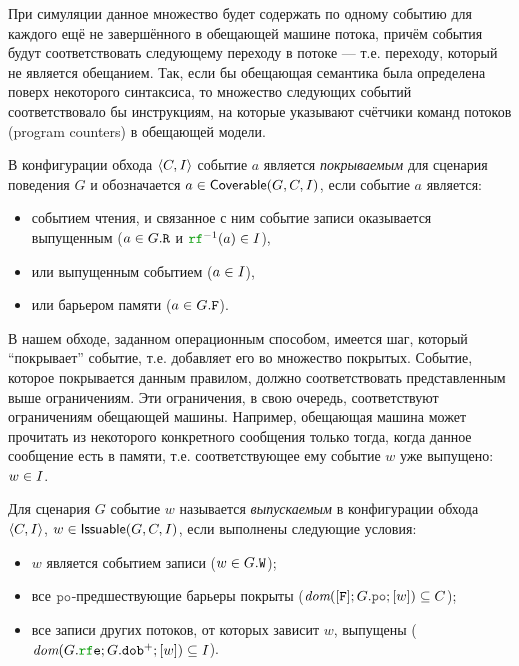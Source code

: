 При симуляции данное множество будет содержать по одному событию для каждого ещё не завершённого в обещающей машине потока,
причём события будут соответствовать следующему переходу в потоке --- т.е. переходу, который не является обещанием.
Так, если бы обещающая семантика была определена поверх некоторого синтаксиса, то множество
следующих событий соответствовало бы инструкциям, на которые указывают счётчики команд  потоков (program counters)
в обещающей модели.
\begin{definition}
В конфигурации обхода ${\langle{C, I}\rangle}$ событие $a$ является \emph{покрываемым} для сценария поведения $G$
и обозначается $a\in {\sf Coverable}(G, C, I)$, если событие $a$ является:
  \begin{itemize}
    \item событием чтения, и связанное с ним событие записи оказывается выпущенным ($a \in G.{\mathtt{R}}$ и $\lRF^{-1}(a) \in \IssuedSet$),
    \item или выпущенным событием ($a \in I$),
    \item или барьером памяти ($a \in G.{\mathtt{F}}$).
  \end{itemize}
\end{definition}
В нашем обходе, заданном операционным способом, имеется шаг, который ``покрывает'' событие, т.е. добавляет
его во множество покрытых. Событие, которое покрывается данным правилом, должно соответствовать представленным выше ограничениям.
Эти ограничения, в свою очередь,  соответствуют ограничениям обещающей машины. Например, обещающая машина может 
прочитать из некоторого конкретного сообщения только тогда, когда данное сообщение есть в памяти,
т.е. соответствующее ему событие $w$ уже выпущено: $w \in I$.
\begin{definition}
Для сценария $G$ событие $w$ называется \emph{выпускаемым}
в конфигурации обхода ${\langle{C, I}\rangle}$,
$w\in{\sf Issuable}(G, C, I)$, если выполнены следующие условия:
      \begin{itemize}
        \item $w$ является событием записи ($w\in G.{\mathtt{W}}$);
        \item все $\lPO$-предшествующие барьеры покрыты
          ($\dom{[\lF];G.\lPO;[w]} \suq C$);
        \item все записи других потоков, от которых зависит $w$, выпущены
          ($\dom{G.\lRFE;G.\lDOB^{+};[w]} \suq \IssuedSet$).
      \end{itemize}
\end{definition}

